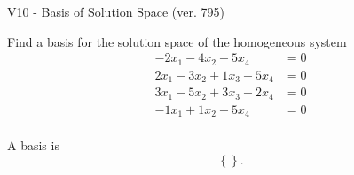 \begin{exercise}
  \begin{exerciseTitle}V10 - Basis of Solution Space (ver. 795)\end{exerciseTitle}
  \begin{exerciseStatement}
    Find a basis for the solution space of the homogeneous system 
\begin{align*}
 -2 x_ 1 -4 x_ 2 -5 x_ 4 &= 0  \\ 
  2 x_ 1 -3 x_ 2 + 1 x_ 3 + 5 x_ 4 &= 0  \\ 
  3 x_ 1 -5 x_ 2 + 3 x_ 3 + 2 x_ 4 &= 0  \\ 
  -1 x_ 1 + 1 x_ 2 -5 x_ 4 &= 0  \\ 
 \end{align*}


 
  \end{exerciseStatement}

  \begin{exerciseAnswer}
   A basis is   
\[\left\{\right\}.\]

  


  \end{exerciseAnswer}
\end{exercise}